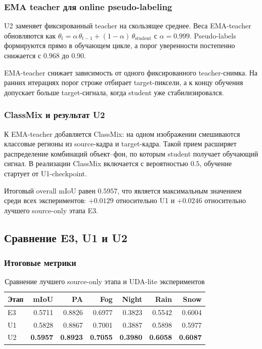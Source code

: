 \documentclass[14pt,a4paper]{extarticle}
\begin{document}
\subsubsection{EMA teacher для online pseudo-labeling}

U2 заменяет фиксированный teacher на скользящее среднее. Веса EMA-teacher обновляются как $\theta_{t} = \alpha\,\theta_{t-1} + (1-\alpha)\,\theta_{\text{student}}$ с $\alpha = 0.999$. Pseudo-labels формируются прямо в обучающем цикле, а порог уверенности постепенно снижается с $0.968$ до $0.90$.

EMA-teacher снижает зависимость от одного фиксированного teacher-снимка. На ранних итерациях порог строже отбирает target-пиксели, а к концу обучения допускает больше target-сигнала, когда student уже стабилизировался.

\subsubsection{ClassMix и результат U2}

К EMA-teacher добавляется ClassMix: на одном изображении смешиваются классовые регионы из source-кадра и target-кадра. Такой прием расширяет распределение комбинаций объект--фон, по которым student получает обучающий сигнал. В реализации ClassMix включается с вероятностью $0.5$, обучение стартует от U1-checkpoint.

Итоговый overall mIoU равен $\mathbf{0.5957}$, что является максимальным значением среди всех экспериментов: $+0.0129$ относительно U1 и $+0.0246$ относительно лучшего source-only этапа E3.

\subsection{Сравнение E3, U1 и U2}

\subsubsection{Итоговые метрики}

\begin{table}[H]
    \centering
    \caption{Сравнение лучшего source-only этапа и UDA-lite экспериментов}
    \label{tab:e3_u1_u2_comparison}
    \small
    \begin{tabular}{lrrrrrr}
        \toprule
        Этап & mIoU & PA & Fog & Night & Rain & Snow \\
        \midrule
        E3 & 0.5711 & 0.8826 & 0.6977 & 0.3823 & 0.5542 & 0.6004 \\
        U1 & 0.5828 & 0.8867 & 0.7001 & 0.3887 & 0.5898 & 0.5977 \\
        U2 & \textbf{0.5957} & \textbf{0.8923} & \textbf{0.7055} & \textbf{0.3980} & \textbf{0.6058} & \textbf{0.6087} \\
        \bottomrule
    \end{tabular}
\end{table}
\end{document}
